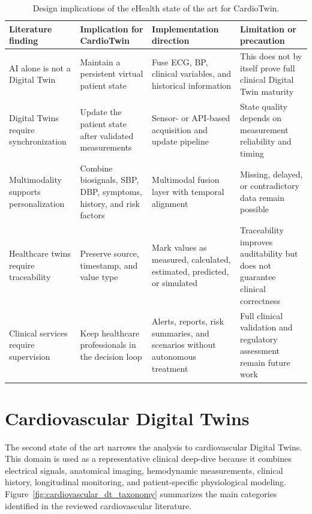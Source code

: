 \begin{table}[H]
\centering
\small
\caption{Design implications of the eHealth state of the art for CardioTwin.}
\label{tab:ehealth_implications_cardiotwin}
\begin{tabularx}{\textwidth}{>{\RaggedRight\arraybackslash}p{3.1cm} >{\RaggedRight\arraybackslash}p{3.35cm} >{\RaggedRight\arraybackslash}p{3.65cm} >{\RaggedRight\arraybackslash}X}
\toprule
\textbf{Literature finding} & \textbf{Implication for CardioTwin} & \textbf{Implementation direction} & \textbf{Limitation or precaution}\\
\midrule
AI alone is not a Digital Twin & Maintain a persistent virtual patient state & Fuse ECG, BP, clinical variables, and historical information & This does not by itself prove full clinical Digital Twin maturity\\
\addlinespace
Digital Twins require synchronization & Update the patient state after validated measurements & Sensor- or API-based acquisition and update pipeline & State quality depends on measurement reliability and timing\\
\addlinespace
Multimodality supports personalization & Combine biosignals, SBP, DBP, symptoms, history, and risk factors & Multimodal fusion layer with temporal alignment & Missing, delayed, or contradictory data remain possible\\
\addlinespace
Healthcare twins require traceability & Preserve source, timestamp, and value type & Mark values as measured, calculated, estimated, predicted, or simulated & Traceability improves auditability but does not guarantee clinical correctness\\
\addlinespace
Clinical services require supervision & Keep healthcare professionals in the decision loop & Alerts, reports, risk summaries, and scenarios without autonomous treatment & Full clinical validation and regulatory assessment remain future work\\
\bottomrule
\end{tabularx}
\end{table}

\section{Cardiovascular Digital Twins}
\label{sec:sota_cardio}

The second state of the art narrows the analysis to cardiovascular Digital Twins. This domain is used as a representative clinical deep-dive because it combines electrical signals, anatomical imaging, hemodynamic measurements, clinical history, longitudinal monitoring, and patient-specific physiological modeling. Figure~\ref{fig:cardiovascular_dt_taxonomy} summarizes the main categories identified in the reviewed cardiovascular literature.

